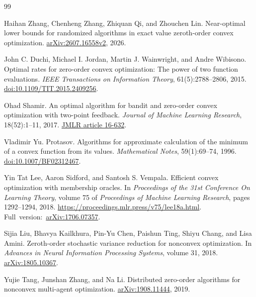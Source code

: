 \documentclass[11pt]{article}
\numberwithin{equation}{section}
\theoremstyle{remark}
\theoremstyle{definition}
\begin{document}
\begin{thebibliography}{99}
\small

Haihan Zhang, Chenheng Zhang, Zhiquan Qi, and Zhouchen Lin.
\newblock Near-optimal lower bounds for randomized algorithms in exact value zeroth-order convex optimization.
\newblock \href{https://arxiv.org/abs/2607.16558v2}{arXiv:2607.16558v2}, 2026.

John C. Duchi, Michael I. Jordan, Martin J. Wainwright, and Andre Wibisono.
\newblock Optimal rates for zero-order convex optimization: The power of two function evaluations.
\newblock \emph{IEEE Transactions on Information Theory}, 61(5):2788--2806, 2015.
\newblock \href{https://doi.org/10.1109/TIT.2015.2409256}{doi:10.1109/TIT.2015.2409256}.

Ohad Shamir.
\newblock An optimal algorithm for bandit and zero-order convex optimization with two-point feedback.
\newblock \emph{Journal of Machine Learning Research}, 18(52):1--11, 2017.
\newblock \href{https://jmlr.org/papers/v18/16-632.html}{JMLR article 16-632}.

Vladimir Yu. Protasov.
\newblock Algorithms for approximate calculation of the minimum of a convex function from its values.
\newblock \emph{Mathematical Notes}, 59(1):69--74, 1996.
\newblock \href{https://doi.org/10.1007/BF02312467}{doi:10.1007/BF02312467}.

Yin Tat Lee, Aaron Sidford, and Santosh S. Vempala.
\newblock Efficient convex optimization with membership oracles.
\newblock In \emph{Proceedings of the 31st Conference On Learning Theory},
volume 75 of \emph{Proceedings of Machine Learning Research}, pages 1292--1294, 2018.
\newblock \url{https://proceedings.mlr.press/v75/lee18a.html}.
\newblock Full~version:~\href{https://arxiv.org/abs/1706.07357}{arXiv:1706.07357}.

Sijia Liu, Bhavya Kailkhura, Pin-Yu Chen, Paishun Ting, Shiyu Chang, and Lisa Amini.
\newblock Zeroth-order stochastic variance reduction for nonconvex optimization.
\newblock In \emph{Advances in Neural Information Processing Systems}, volume 31, 2018.
\newblock \href{https://arxiv.org/abs/1805.10367}{arXiv:1805.10367}.

Yujie Tang, Junshan Zhang, and Na Li.
\newblock Distributed zero-order algorithms for nonconvex multi-agent optimization.
\newblock \href{https://arxiv.org/abs/1908.11444}{arXiv:1908.11444}, 2019.


\end{thebibliography}
\end{document}
